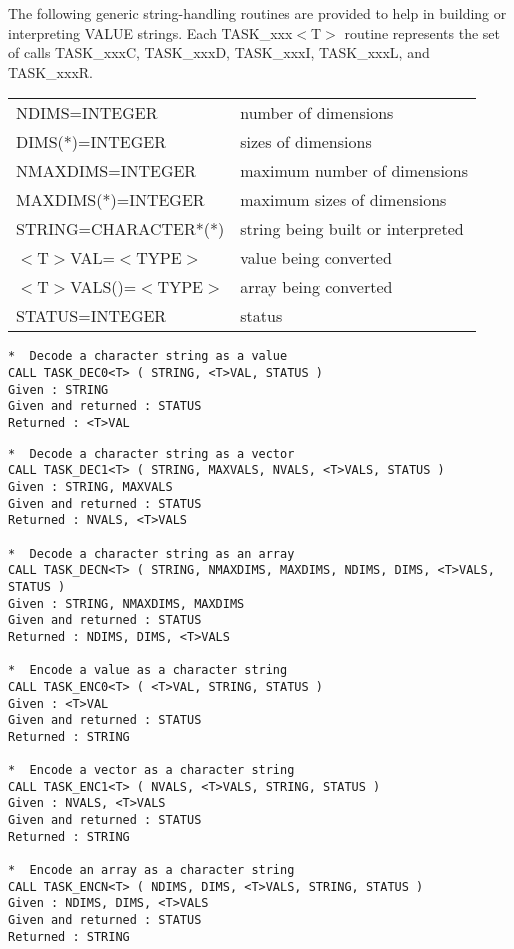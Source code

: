 The following generic string-handling routines are provided to help in 
building or interpreting VALUE strings. Each TASK\_xxx$<$T$>$ routine 
represents the set of calls TASK\_xxxC, TASK\_xxxD, TASK\_xxxI, TASK\_xxxL, 
and TASK\_xxxR.

\small
\begin{center}
\begin{tabular}{ll}
NDIMS=INTEGER            &    number of dimensions \\
DIMS(*)=INTEGER          &    sizes of dimensions \\
NMAXDIMS=INTEGER         &    maximum number of dimensions \\
MAXDIMS(*)=INTEGER       &    maximum sizes of dimensions \\
STRING=CHARACTER*(*)     &    string being built or interpreted \\
$<$T$>$VAL=$<$TYPE$>$    &    value being converted \\
$<$T$>$VALS()=$<$TYPE$>$ &    array being converted \\
STATUS=INTEGER           &    status \\
\end{tabular}
\end{center}
\normalsize

\begin{verbatim}
*  Decode a character string as a value
CALL TASK_DEC0<T> ( STRING, <T>VAL, STATUS )
Given : STRING
Given and returned : STATUS
Returned : <T>VAL
\end{verbatim}
\newpage
\begin{verbatim}
*  Decode a character string as a vector
CALL TASK_DEC1<T> ( STRING, MAXVALS, NVALS, <T>VALS, STATUS )
Given : STRING, MAXVALS
Given and returned : STATUS
Returned : NVALS, <T>VALS

*  Decode a character string as an array
CALL TASK_DECN<T> ( STRING, NMAXDIMS, MAXDIMS, NDIMS, DIMS, <T>VALS, STATUS )
Given : STRING, NMAXDIMS, MAXDIMS
Given and returned : STATUS
Returned : NDIMS, DIMS, <T>VALS

*  Encode a value as a character string
CALL TASK_ENC0<T> ( <T>VAL, STRING, STATUS )
Given : <T>VAL
Given and returned : STATUS
Returned : STRING

*  Encode a vector as a character string
CALL TASK_ENC1<T> ( NVALS, <T>VALS, STRING, STATUS )
Given : NVALS, <T>VALS
Given and returned : STATUS
Returned : STRING

*  Encode an array as a character string
CALL TASK_ENCN<T> ( NDIMS, DIMS, <T>VALS, STRING, STATUS )
Given : NDIMS, DIMS, <T>VALS
Given and returned : STATUS
Returned : STRING
\end{verbatim}

